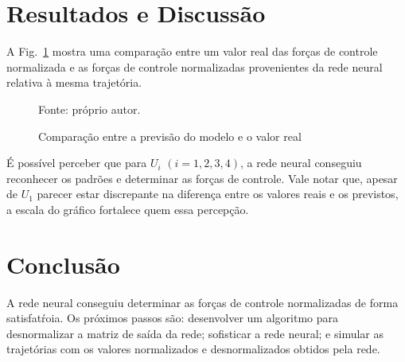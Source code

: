 \section{Resultados e Discussão}

A Fig.~\ref{fig:comparison} mostra uma comparação entre um valor real das forças de controle normalizada e as forças de controle normalizadas provenientes da rede neural relativa à mesma trajetória.
%
\begin{figure}[H]
    \centering
    \caption{Comparação entre a previsão do modelo e o valor real}

    {\footnotesize Fonte: próprio autor.}

    \label{fig:comparison}
\end{figure}
%
É possível perceber que para \(U_i\) \((i = 1, 2, 3, 4)\), a rede neural conseguiu reconhecer os padrões e determinar as forças de controle.
Vale notar que, apesar de \(U_1\) parecer estar discrepante na diferença entre os valores reais e os previstos, a escala do gráfico fortalece quem essa percepção.

\section{Conclusão}

A rede neural conseguiu determinar as forças de controle normalizadas de forma satisfatŕoia. Os próximos passos são: desenvolver um algoritmo para desnormalizar a matriz de saída da rede; sofisticar a rede neural; e simular as trajetórias com os valores normalizados e desnormalizados obtidos pela rede.
%



